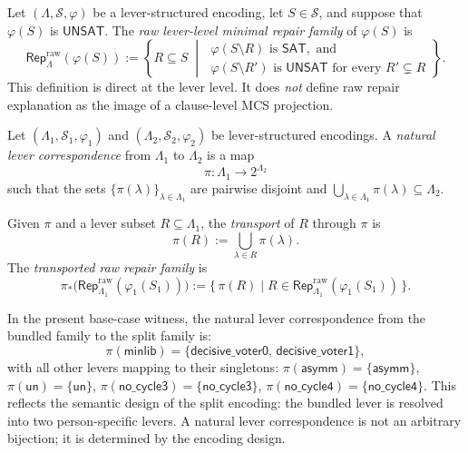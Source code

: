 \begin{definition}
\label{def:raw-repair}
Let $(\Lambda,\mathcal{S},\varphi)$ be a lever-structured encoding, let $S \in \mathcal{S}$, and suppose that $\varphi(S)$ is $\mathsf{UNSAT}$.
The \emph{raw lever-level minimal repair family} of $\varphi(S)$ is
\[
  \mathsf{Rep}^{\mathrm{raw}}_\Lambda(\varphi(S))
  :=
  \left\{
    R \subseteq S \;\middle|\;
    \begin{array}{l}
      \varphi(S \setminus R)\text{ is }\mathsf{SAT}, \text{ and}\\[2pt]
      \varphi(S \setminus R')\text{ is }\mathsf{UNSAT}\text{ for every }R' \subsetneq R
    \end{array}
  \right\}.
\]
This definition is direct at the lever level.
It does \emph{not} define raw repair explanation as the image of a clause-level MCS projection.
\end{definition}

\begin{definition}
\label{def:transport}
Let $(\Lambda_1,\mathcal{S}_1,\varphi_1)$ and $(\Lambda_2,\mathcal{S}_2,\varphi_2)$ be lever-structured encodings.
A \emph{natural lever correspondence} from $\Lambda_1$ to $\Lambda_2$ is a map
\[
  \pi : \Lambda_1 \to 2^{\Lambda_2}
\]
such that the sets $\{\pi(\lambda)\}_{\lambda \in \Lambda_1}$ are pairwise disjoint and $\bigcup_{\lambda \in \Lambda_1} \pi(\lambda) \subseteq \Lambda_2$.

Given $\pi$ and a lever subset $R \subseteq \Lambda_1$, the \emph{transport} of $R$ through $\pi$ is
\[
  \pi(R) := \bigcup_{\lambda \in R} \pi(\lambda).
\]
The \emph{transported raw repair family} is
\[
  \pi_*\!\bigl(\mathsf{Rep}^{\mathrm{raw}}_{\Lambda_1}(\varphi_1(S_1))\bigr)
  :=
  \bigl\{\, \pi(R) \mid R \in \mathsf{Rep}^{\mathrm{raw}}_{\Lambda_1}(\varphi_1(S_1)) \,\bigr\}.
\]
\end{definition}

\begin{remark}
\label{rem:pi-witness}
In the present base-case witness, the natural lever correspondence from the bundled family to the split family is:
\[
  \pi(\mathsf{minlib}) = \{\mathsf{decisive\_voter0},\, \mathsf{decisive\_voter1}\},
\]
with all other levers mapping to their singletons:
$\pi(\mathsf{asymm}) = \{\mathsf{asymm}\}$,
$\pi(\mathsf{un}) = \{\mathsf{un}\}$,
$\pi(\mathsf{no\_cycle3}) = \{\mathsf{no\_cycle3}\}$,
$\pi(\mathsf{no\_cycle4}) = \{\mathsf{no\_cycle4}\}$.
This reflects the semantic design of the split encoding: the bundled lever  is resolved into two person-specific levers.
A natural lever correspondence is not an arbitrary bijection; it is determined by the encoding design.
\end{remark}

